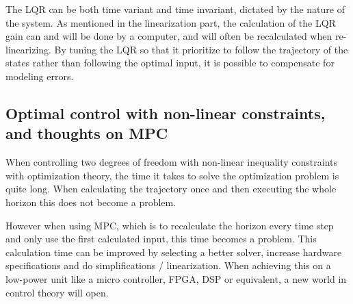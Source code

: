 The LQR can be both time variant and time invariant, dictated by the nature of the system. As mentioned in the linearization part, the calculation of the LQR gain can and will be done by a computer, and will often be recalculated when re-linearizing. By tuning the LQR so that it prioritize to follow the trajectory of the states rather than following the optimal input, it is possible to compensate for modeling errors.

\subsection{Optimal control with non-linear constraints, and thoughts on MPC}
When controlling two degrees of freedom with non-linear inequality constraints with optimization theory, the time it takes to solve the optimization problem is quite long. When calculating the trajectory once and then executing the whole horizon this does not become a problem.

However when using MPC, which is to recalculate the horizon every time step and only use the first calculated input, this time becomes a problem. This calculation time can be improved by selecting a better solver, increase hardware specifications and do simplifications / linearization. When achieving this on a low-power unit like a micro controller, FPGA, DSP or equivalent, a new world in control theory will open.
